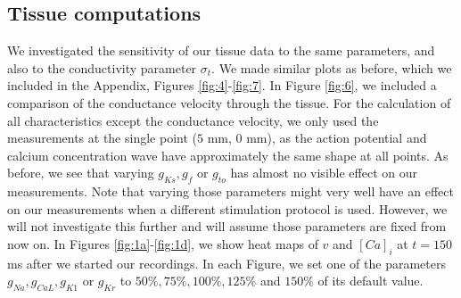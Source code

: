 \documentclass[12pt,a4paper]{article}
\begin{document}
\subsection{Tissue computations} \label{Tissue computations}
We investigated the sensitivity of our tissue data to the same parameters, and also to the conductivity parameter $\sigma_t$. We made similar plots as before, which we included in the Appendix, Figures \ref{fig:4}-\ref{fig:7}. In Figure \ref{fig:6}, we included a comparison of the conductance velocity through the tissue. For the calculation of all characteristics except the conductance velocity, we only used the measurements at the single point ($5$ mm, $0$ mm), as the action potential and calcium concentration wave have approximately the same shape at all points. As before, we see that varying $g_{Ks}, g_{f}$ or $g_{to}$ has almost no visible effect on our measurements. Note that varying those parameters might very well have an effect on our measurements when a different stimulation protocol is used. However, we will not investigate this further and will assume those parameters are fixed from now on. In Figures  \ref{fig:1a}-\ref{fig:1d}, we show heat maps of $v$ and $[Ca]_i$ at $t=150$ ms after we started our recordings. In each Figure, we set one of the parameters $g_{Na}, g_{CaL}, g_{K1}$ or $g_{Kr}$ to $50\%, 75\%, 100\%, 125\%$ and $150\%$ of its default value.
%
\end{document}
